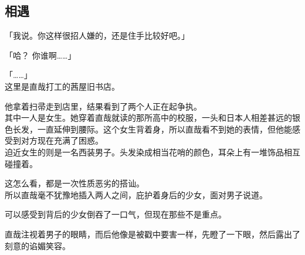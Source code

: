 \subsection{相遇}

「我说。你这样很招人嫌的，还是住手比较好吧。」

「哈？ 你谁啊……」

「……」\\

这里是直哉打工的茜屋旧书店。

他拿着扫帚走到店里，结果看到了两个人正在起争执。\\

其中一人是女生。她穿着直哉就读的那所高中的校服，一头和日本人相差甚远的银色长发，一直延伸到腰际。这个女生背着身，所以直哉看不到她的表情，但他能感受到对方现在充满了困惑。\\

迫近女生的则是一名西装男子。头发染成相当花哨的颜色，耳朵上有一堆饰品相互碰撞着。

这怎么看，都是一次性质恶劣的搭讪。\\

所以直哉毫不犹豫地插入两人之间，庇护着身后的少女，面对男子说道。

可以感受到背后的少女倒吞了一口气，但现在那些不是重点。

直哉注视着男子的眼睛，而后他像是被戳中要害一样，先瞪了一下眼，然后露出了刻意的谄媚笑容。\\

